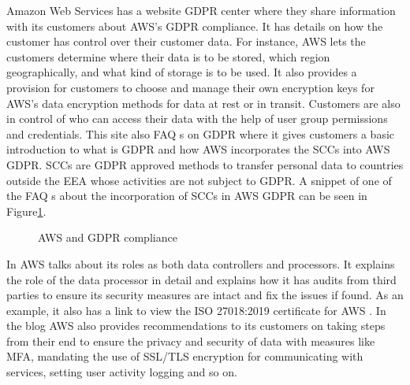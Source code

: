 \begin{itemize}
    Amazon Web Services has a website \acs{GDPR} center \cite{awsgdprcenter} where they share information with its customers about \acs{AWS}'s \acs{GDPR} compliance. It has details on how the customer has control over their customer data. For instance, \acs{AWS} lets the customers determine where their data is to be stored, which region geographically, and what kind of storage is to be used. It also provides a provision for customers to choose and manage their own encryption keys for \acs{AWS}'s data encryption methods for data at rest or in transit. Customers are also in control of who can access their data with the help of user group permissions and credentials. This site also \acs{FAQ} s on \acs{GDPR} where it gives customers a basic introduction to what is \acs{GDPR} and how \acs{AWS} incorporates the \ac{SCC}s  into \acs{AWS} \acs{GDPR}. \acs{SCC}s are \acs{GDPR} approved methods to transfer personal data to countries outside the \ac{EEA} whose activities are not subject to \acs{GDPR}. A snippet of one of the \acs{FAQ} s about the incorporation of \acs{SCC}s in \acs{AWS} \acs{GDPR} can be seen in Figure\ref{awsgdpr}.

    \begin {figure}[ht]
    \centering
    \caption{\acs{AWS} and \acs{GDPR} compliance}
    \label{awsgdpr}
    \end {figure}

   In \cite{awsgdprresp} \acs{AWS} talks about its roles as both data controllers and processors. It explains the role of the data processor in detail and explains how it has audits from third parties to ensure its security measures are intact and fix the issues if found. As an example, it also has a link to view the \acs{ISO} 27018:2019 certificate for \acs{AWS} \cite{awsisocert}. In the blog \cite{awsgdprresp} \acs{AWS} also provides recommendations to its customers on taking steps from their end to ensure the privacy and security of data with measures like \ac{MFA}, mandating the use of \acs{SSL}/\acs{TLS} encryption for communicating with services, setting user activity logging and so on.
    

\end{itemize}
